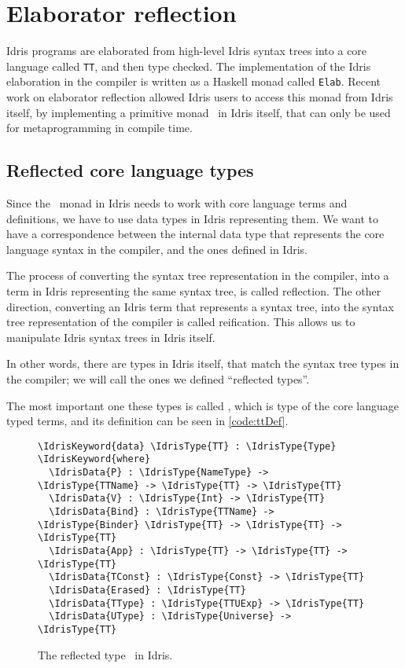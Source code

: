 \section{Elaborator reflection}\label{sec:elabref}

Idris programs are elaborated from high-level Idris syntax trees into a core
language called \texttt{TT}, and then type checked.\cite{idris}
The implementation of the Idris elaboration in the compiler is written as a
Haskell monad called \texttt{Elab}.
Recent work on elaborator reflection\cite{elabref} allowed Idris users to
access this monad from Idris itself, by implementing a primitive monad
\Elab\ in Idris itself, that can only be used for metaprogramming in compile
time.

\subsection{Reflected core language types}\label{ssec:reflectedTypes}

Since the \Elab\ monad in Idris needs to work with core language terms and
definitions, we have to use data types in Idris representing them.
We want to have a correspondence between the internal data type that represents
the core language syntax in the compiler, and the ones defined in Idris.

The process of converting the syntax tree representation in the compiler, into
a term in Idris representing the same syntax tree, is called reflection.
The other direction, converting an Idris term that represents a syntax tree,
into the syntax tree representation of the compiler is called reification.
This allows us to manipulate Idris syntax trees in Idris itself.

In other words, there are types in Idris itself, that match the syntax
tree types in the compiler; we will call the ones we defined ``reflected
types''.

The most important one these types is called \TT,
which is type of the core language typed terms, and its definition can be seen
in \autoref{code:ttDef}.

\begin{figure}[ht]
\caption{The reflected type \protect\TT\ in Idris.}
\label{code:ttDef}
\begin{Verbatim}[framesep=2mm, label=\footnotesize{\normalfont{Idris}}, labelposition=topline]
\IdrisKeyword{data} \IdrisType{TT} : \IdrisType{Type} \IdrisKeyword{where}
  \IdrisData{P} : \IdrisType{NameType} -> \IdrisType{TTName} -> \IdrisType{TT} -> \IdrisType{TT}
  \IdrisData{V} : \IdrisType{Int} -> \IdrisType{TT}
  \IdrisData{Bind} : \IdrisType{TTName} -> \IdrisType{Binder} \IdrisType{TT} -> \IdrisType{TT} -> \IdrisType{TT}
  \IdrisData{App} : \IdrisType{TT} -> \IdrisType{TT} -> \IdrisType{TT}
  \IdrisData{TConst} : \IdrisType{Const} -> \IdrisType{TT}
  \IdrisData{Erased} : \IdrisType{TT}
  \IdrisData{TType} : \IdrisType{TTUExp} -> \IdrisType{TT}
  \IdrisData{UType} : \IdrisType{Universe} -> \IdrisType{TT}
\end{Verbatim}
\end{figure}

